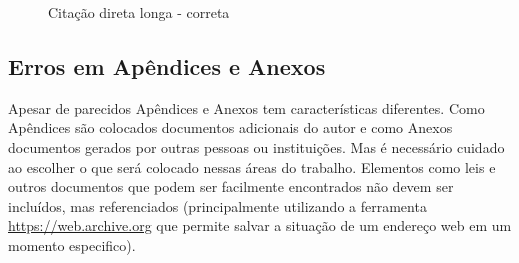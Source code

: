 \begin{figure}[htb]
    \centering
    \caption{Citação direta longa - correta}
    \label{fig_citacao_longa_certa}
\end{figure}


\subsection{Erros em Apêndices e Anexos}
\label{erros-apendices-e-anexos}

Apesar de parecidos Apêndices e Anexos tem características diferentes. Como Apêndices são colocados documentos adicionais do autor e como Anexos documentos gerados por outras pessoas ou instituições. Mas é necessário cuidado ao escolher o que será colocado nessas áreas do trabalho. Elementos como leis e outros documentos que podem ser facilmente encontrados não devem ser incluídos, mas referenciados (principalmente utilizando a ferramenta \url{https://web.archive.org} que permite salvar a situação de um endereço web em um momento especifico).  

